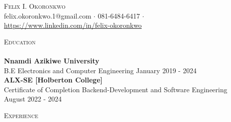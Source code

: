 \documentclass[a4paper]{article}
\newcommand{\lineunder} {
    \vspace*{-8pt} \\
    \hspace*{-18pt} \hrulefill \\
}
\newcommand{\header} [1] {
    {\hspace*{-18pt}\vspace*{6pt} \textsc{#1}}
    \vspace*{-6pt} \lineunder
}
\begin{document}
\vspace*{-40pt}

    

\vspace*{-10pt}
\begin{center}
	{\Huge \scshape {Felix I. Okoronkwo}}\\
	felix.okoronkwo.1@gmail.com $\cdot$ 081-6484-6417 $\cdot$ \url{https://www.linkedin.com/in/felix-okoronkwo} \\
\end{center}

\header{Education}
\textbf{Nnamdi Azikiwe University}\\
B.E Electronics and Computer Engineering \hfill January 2019 - 2024\\
\vspace{2mm}
\textbf{ALX-SE [Holberton College]}\\
Certificate of Completion Backend-Development and Software Engineering \hfill August 2022 - 2024\\
\vspace{2mm}

\header{Experience}
\vspace{1mm}
\end{document}
